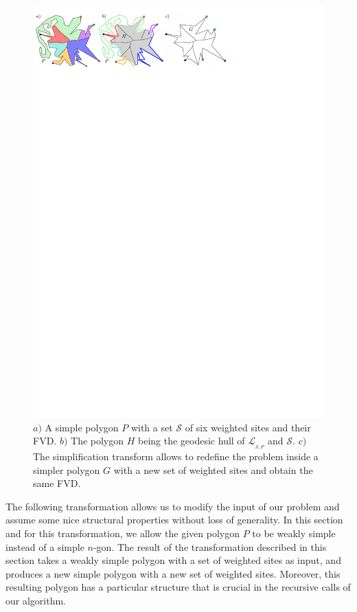 \documentclass[a4paper, 11pt]{article}
\newcommand{\s}{\mathcal S}
\newcommand{\LL}[1][\s, P]{\ensuremath{\mathcal L_{_{#1}}}}
\begin{document}
\begin{figure}[t]
\centering
\includegraphics{imgSimplification.pdf}
\caption{$a)$ A simple polygon $P$ with a set $\s$ of six weighted sites and their FVD. $b)$ The polygon $H$ being the geodesic hull of $\LL$ and $\s$.
$c)$ The simplification transform allows to redefine the problem inside a simpler polygon $G$ with a new set of weighted sites and obtain the same FVD.}
\label{fig:FVD}
\end{figure}

The following transformation allows us to modify the input of our problem and assume some nice structural properties without loss of generality.
In this section and for this transformation, we allow the given polygon $P$ to be weakly simple instead of a simple $n$-gon. 
The result of the transformation described in this section takes a weakly simple polygon with a set of weighted sites as input, and produces a new simple polygon with a new set of weighted sites. Moreover, this resulting polygon has a particular structure that is crucial in the recursive calls of our algorithm.
\end{document}
